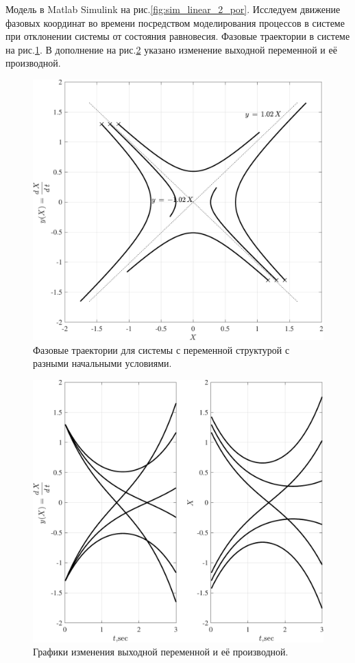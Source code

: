 Модель в Matlab Simulink на рис.\ref{fig:sim_linear_2_por}. 
Исследуем движение фазовых координат во времени посредством моделирования процессов в системе при отклонении системы от состояния равновесия. Фазовые траектории в системе на рис.\ref{fig:linear_2_por_ft_sedlo}. 
В дополнение на рис.\ref{fig:linear_2_por_sv_sedlo} указано изменение выходной переменной и её производной. 
\begin{figure}[!h]\centering
\includegraphics[width=1.0\linewidth]{images/linear_2_por_ft_sedlo}
\caption{ Фазовые траектории для системы с переменной структурой с разными начальными условиями.}\label{fig:linear_2_por_ft_sedlo}
\end{figure}
\begin{figure}[!h]\centering
\includegraphics[width=1.0\linewidth]{images/linear_2_por_sv_sedlo}
\caption{ Графики изменения выходной переменной и её производной.}\label{fig:linear_2_por_sv_sedlo}
\end{figure}


